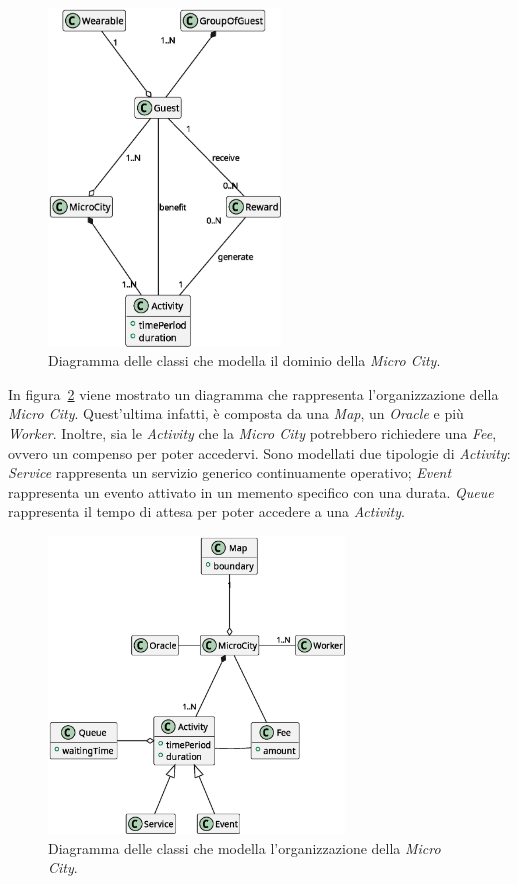 \begin{figure}[H]
    \centering
    \includegraphics[width=0.55\textwidth]{./img/domain_overview-0}
    \caption{Diagramma delle classi che modella il dominio della \textit{Micro City}.}
    \label{fig:domain-overview}
\end{figure}

\newpage

In figura~\ref{fig:micro-city} viene mostrato un diagramma che rappresenta l'organizzazione della \textit{Micro City}.
Quest'ultima infatti, è composta da una \textit{Map}, un \textit{Oracle} e più \textit{Worker}.
Inoltre, sia le \textit{Activity} che la \textit{Micro City} potrebbero richiedere una \textit{Fee}, ovvero un compenso per
poter accedervi.
Sono modellati due tipologie di \textit{Activity}: \textit{Service} rappresenta un servizio generico continuamente operativo;
\textit{Event} rappresenta un evento attivato in un memento specifico con una durata.
\textit{Queue} rappresenta il tempo di attesa per poter accedere a una \textit{Activity}.

\begin{figure}[H]
    \centering
    \includegraphics[width=0.7\textwidth]{./img/micro_city-0}
    \caption{Diagramma delle classi che modella l'organizzazione della \textit{Micro City}.}
    \label{fig:micro-city}
\end{figure}

